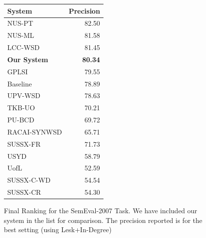 \documentclass[12pt,letterpaper]{article}
\begin{document}

\begin{figure}
\centering
\begin{tabular}{|l|r|}
System & Precision \\
\hline
NUS-PT & 82.50 \\
NUS-ML & 81.58 \\
LCC-WSD & 81.45 \\
\textbf{Our System} & \textbf{80.34}\\
GPLSI & 79.55 \\
Baseline & 78.89 \\
UPV-WSD & 78.63 \\
TKB-UO & 70.21 \\
PU-BCD & 69.72 \\
RACAI-SYNWSD & 65.71 \\
SUSSX-FR & 71.73 \\
USYD & 58.79 \\
UofL & 52.59 \\
SUSSX-C-WD & 54.54 \\
SUSSX-CR & 54.30 \\
\end{tabular}
\caption{Final Ranking for the SemEval-2007 Task. We have included our system in the list for comparison. The precision reported is for the best setting (using Lesk+In-Degree)}
\end{figure}

\end{document}
